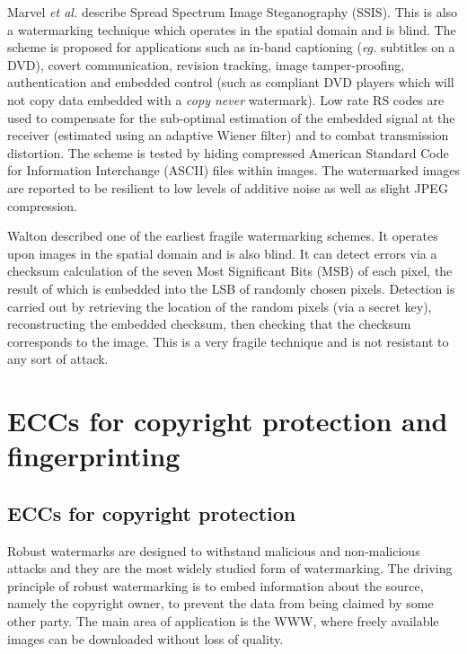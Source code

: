 \documentclass[12pt]{report}
\begin{document}
Marvel \emph{et al.} \cite{ECCb4:marvel1, ECCb4:marvel2, ECCb4:marvel3, ECCb4:marvel4} describe Spread Spectrum Image
Steganography (SSIS). This is also a watermarking technique which operates in the spatial domain and 
is blind. The scheme is proposed for applications such as in-band captioning (\emph{eg.} subtitles on a DVD), 
covert communication, revision tracking, image tamper-proofing, authentication and embedded control (such as
compliant DVD players which will not copy data embedded with a \emph{copy never} watermark). Low rate RS codes are used to
compensate for the sub-optimal estimation of the embedded signal at the receiver (estimated using an adaptive Wiener filter)
and to combat transmission distortion. 
The scheme is tested by hiding compressed American Standard Code for Information Interchange (ASCII) files within images. The watermarked images are
reported to be resilient to low levels of additive noise as well as slight JPEG compression.

Walton \cite{ECCb4:walton} described one of the earliest fragile watermarking schemes. It operates upon images in the spatial domain 
and is also blind. It can detect errors via a checksum calculation of the seven Most Significant Bits (MSB) 
of each pixel, the result of which is embedded 
into the LSB of randomly chosen pixels. 
Detection is carried out by retrieving the location of the random pixels (via a secret key),
reconstructing the embedded checksum, then checking that the checksum corresponds to the image. This is a very fragile technique and
is not resistant to any sort of attack. 

\section{ECCs for copyright protection and fingerprinting}

\subsection{ECCs for copyright protection}
Robust watermarks are designed to withstand malicious and non-malicious attacks and they are the most widely 
studied form of watermarking. The driving principle of robust watermarking is to embed information about the source,
namely the copyright owner, to prevent the data from being claimed by some other party. The main area of application is 
the WWW, where freely available images can be downloaded without loss of quality. 
\end{document}

